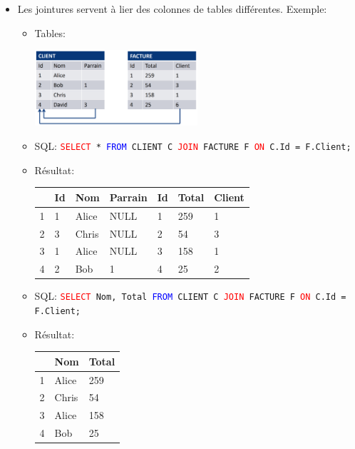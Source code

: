 \documentclass[a4paper]{article}
\begin{document}
\begin{itemize}



\item Les jointures servent à lier des colonnes de tables différentes. Exemple:
\begin{itemize}
    \item Tables:
    \begin{center}
        \includegraphics[width=0.5\textwidth]{../images/jointures-01.PNG}
    \end{center}
    \item SQL: \texttt{\textcolor{red}{SELECT} * \textcolor{blue}{FROM} CLIENT C \textcolor{red}{JOIN} FACTURE F \textcolor{red}{ON} C.Id = F.Client;}
    \item Résultat:
    \begin{center}
        \begin{tabular}{|l|l|l|l|l|l|l|} \hline
            & Id & Nom & Parrain & Id & Total & Client \\ \hline
            1 &  1 & Alice & NULL & 1 & 259 & 1 \\ \hline
            2 &  3 & Chris & NULL & 2 &  54 & 3 \\ \hline
            3 &  1 & Alice & NULL & 3 & 158 & 1 \\ \hline
            4 &  2 & Bob   & 1    & 4 &  25 & 2 \\ \hline
        \end{tabular}
    \end{center}
    \item SQL: \texttt{\textcolor{red}{SELECT} Nom, Total \textcolor{blue}{FROM} CLIENT C \textcolor{red}{JOIN} FACTURE F \textcolor{red}{ON} C.Id = F.Client;}
    \item Résultat:
    \begin{center}
        \begin{tabular}{|l|l|l|} \hline
            & Nom & Total \\ \hline
            1 & Alice & 259 \\ \hline
            2 & Chris &  54 \\ \hline
            3 & Alice & 158 \\ \hline
            4 &   Bob &  25 \\ \hline
        \end{tabular}
    \end{center}
\end{itemize}




\end{itemize}
\end{document}
